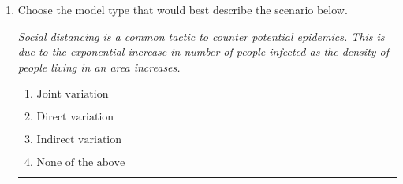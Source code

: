 \documentclass[14pt]{extbook}
\newcommand{\litem}[1]{\item#1\hspace*{-1cm}\rule{\textwidth}{0.4pt}}
\begin{document}
\begin{enumerate}
{\begin{enumerate}[label=\Alph*.]
\end{enumerate} }
\litem{
Choose the model type that would best describe the scenario below.
\begin{center}
    \textit{ Social distancing is a common tactic to counter potential epidemics. This is due to the exponential increase in number of people infected as the density of people living in an area increases. }
\end{center}
\begin{enumerate}[label=\Alph*.]
\item \( \text{Joint variation} \)
\item \( \text{Direct variation} \)
\item \( \text{Indirect variation} \)
\item \( \text{None of the above} \)

\end{enumerate} }
\end{enumerate}
\end{document}
